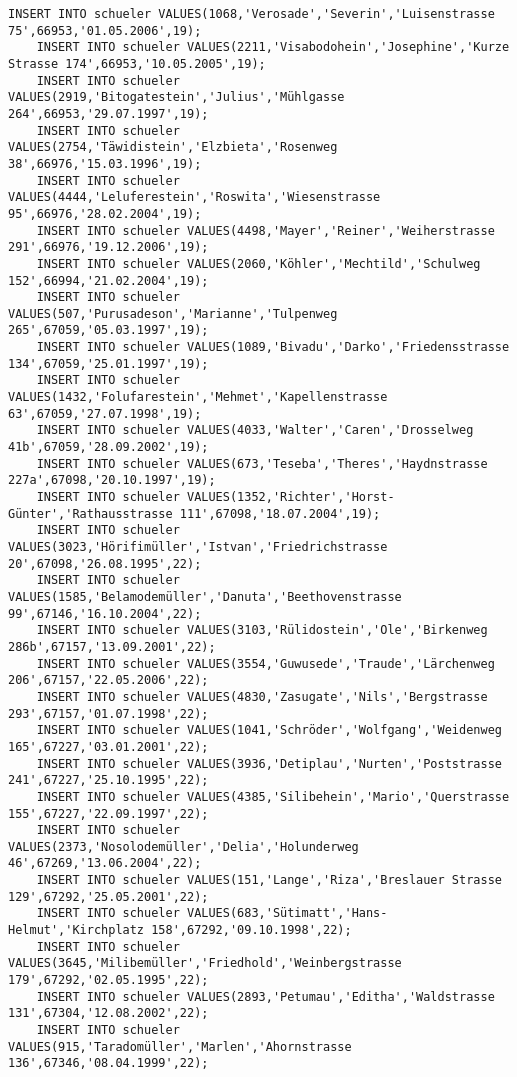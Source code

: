 \begin{lstlisting}[breaklines=True, numbers=none, basicstyle=\tiny, keepspaces=false]
	INSERT INTO schueler VALUES(1068,'Verosade','Severin','Luisenstrasse 75',66953,'01.05.2006',19);
	INSERT INTO schueler VALUES(2211,'Visabodohein','Josephine','Kurze Strasse 174',66953,'10.05.2005',19);
	INSERT INTO schueler VALUES(2919,'Bitogatestein','Julius','Mühlgasse 264',66953,'29.07.1997',19);
	INSERT INTO schueler VALUES(2754,'Täwidistein','Elzbieta','Rosenweg 38',66976,'15.03.1996',19);
	INSERT INTO schueler VALUES(4444,'Leluferestein','Roswita','Wiesenstrasse 95',66976,'28.02.2004',19);
	INSERT INTO schueler VALUES(4498,'Mayer','Reiner','Weiherstrasse 291',66976,'19.12.2006',19);
	INSERT INTO schueler VALUES(2060,'Köhler','Mechtild','Schulweg 152',66994,'21.02.2004',19);
	INSERT INTO schueler VALUES(507,'Purusadeson','Marianne','Tulpenweg 265',67059,'05.03.1997',19);
	INSERT INTO schueler VALUES(1089,'Bivadu','Darko','Friedensstrasse 134',67059,'25.01.1997',19);
	INSERT INTO schueler VALUES(1432,'Folufarestein','Mehmet','Kapellenstrasse 63',67059,'27.07.1998',19);
	INSERT INTO schueler VALUES(4033,'Walter','Caren','Drosselweg 41b',67059,'28.09.2002',19);
	INSERT INTO schueler VALUES(673,'Teseba','Theres','Haydnstrasse 227a',67098,'20.10.1997',19);
	INSERT INTO schueler VALUES(1352,'Richter','Horst-Günter','Rathausstrasse 111',67098,'18.07.2004',19);
	INSERT INTO schueler VALUES(3023,'Hörifimüller','Istvan','Friedrichstrasse 20',67098,'26.08.1995',22);
	INSERT INTO schueler VALUES(1585,'Belamodemüller','Danuta','Beethovenstrasse 99',67146,'16.10.2004',22);
	INSERT INTO schueler VALUES(3103,'Rülidostein','Ole','Birkenweg 286b',67157,'13.09.2001',22);
	INSERT INTO schueler VALUES(3554,'Guwusede','Traude','Lärchenweg 206',67157,'22.05.2006',22);
	INSERT INTO schueler VALUES(4830,'Zasugate','Nils','Bergstrasse 293',67157,'01.07.1998',22);
	INSERT INTO schueler VALUES(1041,'Schröder','Wolfgang','Weidenweg 165',67227,'03.01.2001',22);
	INSERT INTO schueler VALUES(3936,'Detiplau','Nurten','Poststrasse 241',67227,'25.10.1995',22);
	INSERT INTO schueler VALUES(4385,'Silibehein','Mario','Querstrasse 155',67227,'22.09.1997',22);
	INSERT INTO schueler VALUES(2373,'Nosolodemüller','Delia','Holunderweg 46',67269,'13.06.2004',22);
	INSERT INTO schueler VALUES(151,'Lange','Riza','Breslauer Strasse 129',67292,'25.05.2001',22);
	INSERT INTO schueler VALUES(683,'Sütimatt','Hans-Helmut','Kirchplatz 158',67292,'09.10.1998',22);
	INSERT INTO schueler VALUES(3645,'Milibemüller','Friedhold','Weinbergstrasse 179',67292,'02.05.1995',22);
	INSERT INTO schueler VALUES(2893,'Petumau','Editha','Waldstrasse 131',67304,'12.08.2002',22);
	INSERT INTO schueler VALUES(915,'Taradomüller','Marlen','Ahornstrasse 136',67346,'08.04.1999',22);

\end{lstlisting}
